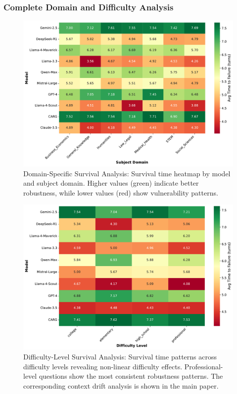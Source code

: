 \documentclass[letterpaper]{article}
\begin{document}
\subsubsection*{Complete Domain and Difficulty Analysis}

\begin{figure}[ht]
\centering
\includegraphics[width=\columnwidth]{figs/model_subject_clustering_survival_heatmap.pdf}
\caption{Domain-Specific Survival Analysis: Survival time heatmap by model and subject domain. Higher values (green) indicate better robustness, while lower values (red) show vulnerability patterns.}
\label{fig:domain_survival_detailed}
\end{figure}

\begin{figure}[ht]
\centering
\includegraphics[width=\columnwidth]{figs/model_difficulty_survival_heatmap.pdf}
\caption{Difficulty-Level Survival Analysis: Survival time patterns across difficulty levels revealing non-linear difficulty effects. Professional-level questions show the most consistent robustness patterns. The corresponding context drift analysis is shown in the main paper.}
\label{fig:difficulty_survival_detailed}
\end{figure}
\end{document}
